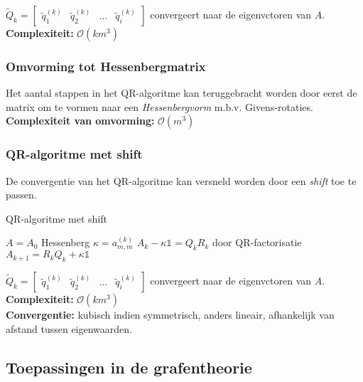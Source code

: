 \documentclass{article}
\begin{document}
	$\tilde{Q}_k = 
	\begin{bmatrix}
		\tilde{q}_1^{(k)} & \tilde{q}_2^{(k)} & ... & \tilde{q}_i^{(k)}
	\end{bmatrix}$ convergeert naar de eigenvctoren van $A$.\\
	
	
	\textbf{Complexiteit:} $\mathcal{O}(km^3)$
	
	\subsubsection{Omvorming tot Hessenbergmatrix}
	
	Het aantal stappen in het QR-algoritme kan teruggebracht worden door eerst de matrix om te vormen naar een \textit{Hessenbergvorm} m.b.v. Givens-rotaties.\\
		
	\textbf{Complexiteit van omvorming:} $\mathcal{O}(m^3)$
	
	\subsubsection{QR-algoritme met shift}
	
	De convergentie van het QR-algoritme kan versneld worden door een \textit{shift} toe te passen.
	
	\pagebreak
	
	\begin{algorithm}[!ht]
		\caption{QR-algoritme met shift}
		\begin{algorithmic}[1]
				\State $A=A_0$ Hessenberg
					\State $\kappa = a_{m,m}^{(k)}$
					\State $A_k - \kappa \mathbb{1} = Q_k R_k$ door QR-factorisatie
					\State $A_{k+1} = R_k Q_k + \kappa \mathbb{1}$
				\EndFor
			\EndProcedure
		\end{algorithmic}
	\end{algorithm}	
	$\tilde{Q}_k = 
	\begin{bmatrix}
	\tilde{q}_1^{(k)} & \tilde{q}_2^{(k)} & ... & \tilde{q}_i^{(k)}
	\end{bmatrix}$ convergeert naar de eigenvctoren van $A$.\\
	
	
	\textbf{Complexiteit:} $\mathcal{O}(km^3)$ \\
	\textbf{Convergentie:} kubisch indien symmetrisch, anders lineair, afhankelijk van afstand tussen eigenwaarden.
	
	\subsection{Toepassingen in de grafentheorie}
	
\end{document}
